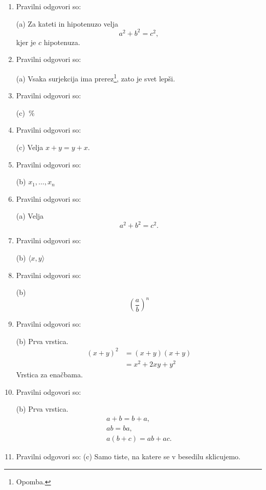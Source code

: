 \documentclass[11pt]{article}
\begin{document}
\begin{enumerate}
        (b)\;
        prof.~Novak


    \item Pravilni odgovori so: %
    
        (a) \;
Za kateti in hipotenuzo velja
\[
  a^2 + b^2 = c^2,
\]
kjer je \(c\) hipotenuza.


    \item Pravilni odgovori so: %
    
        (a)\;
         Vsaka surjekcija ima prerez\footnote{Opomba.}, zato je svet lepši.


    \item Pravilni odgovori so: %

        (c)~\%

    \item Pravilni odgovori so: %

    (c)\;
    Velja \(x + y = y + x\).

    \item Pravilni odgovori so: %

        (b)\;
        \(x_1, \ldots, x_n\)

    \item Pravilni odgovori so: %
        
    (a) Velja
\[
  a^2 + b^2 = c^2.
\]


    \item Pravilni odgovori so: %

      (b)\;
       \(\langle x, y \rangle\)


    \item Pravilni odgovori so: %

        (b)\;
        \[ \left(\frac{a}{b}\right)^n \]


    \item Pravilni odgovori so: %

        (b)\;
        Prva vrstica.
\begin{align*}
  (x + y)^2 &= (x + y)(x + y) \\
  &= x^2 + 2 x y + y^2
\end{align*}
        Vrstica za enačbama.


    \item Pravilni odgovori so: %

      (b)\;
       Prva vrstica.
\begin{gather*}
  a + b = b + a, \\
  a b = b a, \\
  a (b + c) = a b + a c.
\end{gather*}


    \item Pravilni odgovori so: (c) Samo tiste, na katere se v besedilu sklicujemo.%

\end{enumerate}
\end{document}

